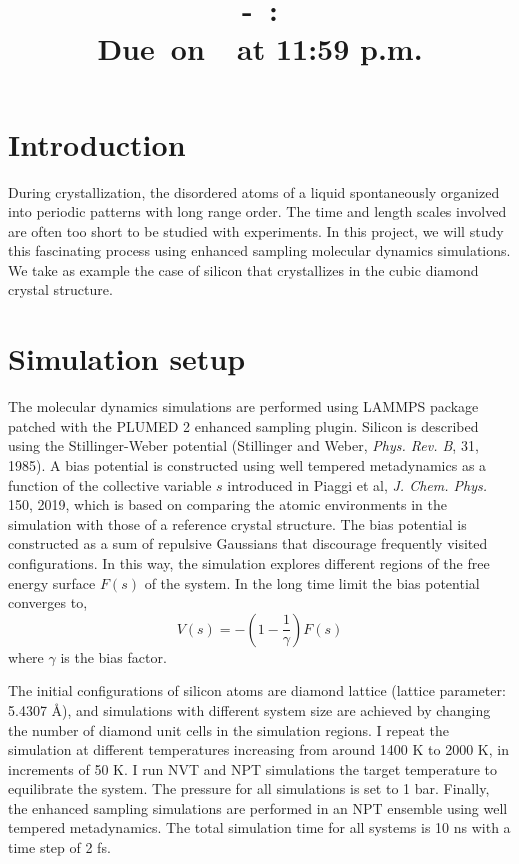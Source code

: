 \documentclass{article}
\title{
    \vspace{2in}
    \textmd{\textbf{\hmwkClassNo\ -\ \hmwkClass:\ \hmwkTitle}}\\
    \normalsize\vspace{0.1in}\small{Due\ on\ \hmwkDueDate\ at 11:59 p.m.}\\
    \vspace{0.1in}\large{\textit{\hmwkClassInstructor}}
    \vspace{3in}
}
\author{\hmwkAuthorName}
\date{}
\begin{document}
\maketitle

\pagebreak

\section{Introduction}

During crystallization, the disordered atoms of a liquid spontaneously organized into periodic patterns with long range order. The time and length scales involved are often too short to be studied with experiments. In this project, we will study this fascinating process using enhanced sampling molecular dynamics simulations. We take as example the case of silicon that crystallizes in the cubic diamond crystal structure.

\section{Simulation setup}

The molecular dynamics simulations are performed using LAMMPS package patched with the PLUMED 2 enhanced sampling plugin. Silicon is described using the Stillinger-Weber potential (Stillinger and Weber, {\it Phys. Rev. B}, 31, 1985). A bias potential is constructed using well tempered metadynamics as a function of the collective variable $s$ introduced in Piaggi et al, {\it J. Chem. Phys.} 150, 2019, which is based on comparing the atomic environments in the simulation with those of a reference crystal structure. The bias potential is constructed as a sum of repulsive Gaussians that discourage frequently visited configurations. In this way, the simulation explores different regions of the free energy surface $F(s)$ of the system. In the long time limit the bias potential converges to,
\begin{equation}
    V(s) = -\left(1 - \frac{1}{\gamma} \right) F(s)
\end{equation}
where $\gamma$ is the bias factor.

The initial configurations of silicon atoms are diamond lattice (lattice parameter: 5.4307 \AA), and simulations with different system size are achieved by changing the number of diamond unit cells in the simulation regions. I repeat the simulation at different temperatures increasing from around 1400 K to 2000 K, in increments of 50 K. I run NVT and NPT simulations the target temperature to equilibrate the system. The pressure for all simulations is set to 1 bar. Finally, the enhanced sampling simulations are performed in an NPT ensemble using well tempered metadynamics. The total simulation time for all systems is 10 ns with a time step of 2 fs. 
\end{document}
